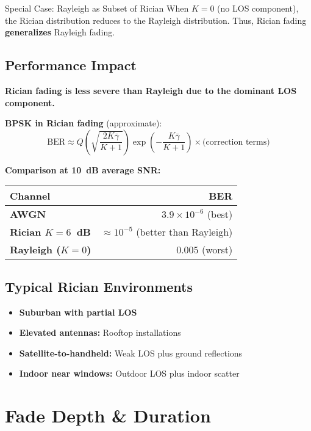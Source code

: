 \begin{calloutbox}{Special Case: Rayleigh as Subset of Rician}
When $K = 0$ (no LOS component), the Rician distribution reduces to the Rayleigh distribution. Thus, Rician fading \textbf{generalizes} Rayleigh fading.
\end{calloutbox}

\subsection{Performance Impact}

\textbf{Rician fading is less severe than Rayleigh due to the dominant LOS component.}

\textbf{BPSK in Rician fading} (approximate):
\begin{equation}
\text{BER} \approx Q\left(\sqrt{\frac{2K\bar{\gamma}}{K+1}}\right) \exp\left(-\frac{K\bar{\gamma}}{K+1}\right) \times \text{(correction terms)}
\label{eq:bpsk-rician-ber}
\end{equation}

\textbf{Comparison at 10~dB average SNR:}
\begin{center}
\begin{tabular}{@{}lr@{}}
\toprule
Channel & BER \\
\midrule
\textbf{AWGN} & $3.9 \times 10^{-6}$ (best) \\
\textbf{Rician $K=6$~dB} & $\approx 10^{-5}$ (better than Rayleigh) \\
\textbf{Rayleigh ($K=0$)} & $0.005$ (worst) \\
\bottomrule
\end{tabular}
\end{center}

\subsection{Typical Rician Environments}

\begin{itemize}
\item \textbf{Suburban with partial LOS}
\item \textbf{Elevated antennas:} Rooftop installations
\item \textbf{Satellite-to-handheld:} Weak LOS plus ground reflections
\item \textbf{Indoor near windows:} Outdoor LOS plus indoor scatter
\end{itemize}

\section{Fade Depth \& Duration}

